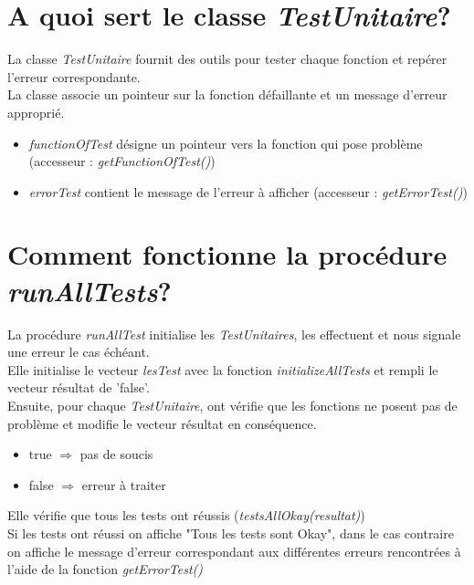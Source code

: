 \documentclass{article}
\begin{document}
		\section{A quoi sert le classe \textit{TestUnitaire}?}
	La classe \textit{TestUnitaire} fournit des outils pour tester chaque fonction et repérer l'erreur correspondante.\\
	La classe associe un pointeur sur la fonction défaillante et un message d'erreur approprié.\\
		\begin{itemize}
			\item  \textit{functionOfTest} désigne un pointeur vers la fonction qui pose problème (accesseur : \textit{getFunctionOfTest()})
			\item  \textit{errorTest} contient le message de l'erreur à afficher (accesseur : \textit{getErrorTest()})
		\end{itemize}
		\section{Comment fonctionne la procédure \textit{runAllTests}?}
		La procédure \textit{runAllTest} initialise les \textit{TestUnitaires}, les effectuent et nous signale une erreur le cas échéant.\\
		Elle initialise le vecteur \textit{lesTest} avec la fonction \textit{initializeAllTests} et rempli le vecteur résultat de 'false'.\\
		Ensuite, pour chaque \textit{TestUnitaire}, ont vérifie que les fonctions ne posent pas de problème et modifie le vecteur résultat en conséquence.
		\begin{itemize}
			\item true $\Rightarrow$ pas de soucis
			\item false $\Rightarrow$ erreur à traiter
		\end{itemize}
		Elle vérifie que tous les tests ont réussis (\textit{testsAllOkay(resultat)})\\
		Si les tests ont réussi on affiche "Tous les tests sont Okay",
		dans le cas contraire on affiche le message d'erreur correspondant aux différentes erreurs 
		rencontrées à l'aide de la fonction \textit{getErrorTest()}
\end{document}
